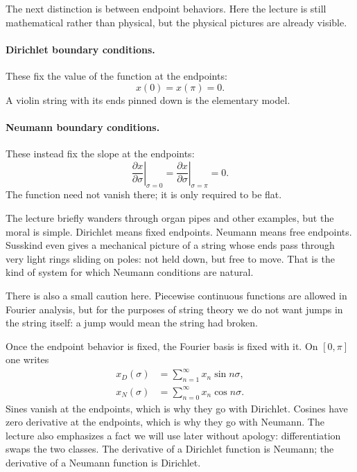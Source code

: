 The next distinction is between endpoint behaviors. Here the lecture is still mathematical rather than physical, but the physical pictures are already visible.

\paragraph{Dirichlet boundary conditions.}
These fix the value of the function at the endpoints:
\begin{equation}
x(0)=x(\pi)=0.
\end{equation}
A violin string with its ends pinned down is the elementary model.

\paragraph{Neumann boundary conditions.}
These instead fix the slope at the endpoints:
\begin{equation}
\left.\frac{\partial x}{\partial \sigma}\right|_{\sigma=0}
=
\left.\frac{\partial x}{\partial \sigma}\right|_{\sigma=\pi}
=0.
\end{equation}
The function need not vanish there; it is only required to be flat.

The lecture briefly wanders through organ pipes and other examples, but the moral is simple. Dirichlet means fixed endpoints. Neumann means free endpoints. Susskind even gives a mechanical picture of a string whose ends pass through very light rings sliding on poles: not held down, but free to move. That is the kind of system for which Neumann conditions are natural.

There is also a small caution here. Piecewise continuous functions are allowed in Fourier analysis, but for the purposes of string theory we do not want jumps in the string itself: a jump would mean the string had broken.

Once the endpoint behavior is fixed, the Fourier basis is fixed with it. On \([0,\pi]\) one writes
\begin{align}
x_D(\sigma) &= \sum_{n=1}^{\infty} x_n \sin n\sigma, \\
x_N(\sigma) &= \sum_{n=0}^{\infty} x_n \cos n\sigma .
\end{align}
Sines vanish at the endpoints, which is why they go with Dirichlet. Cosines have zero derivative at the endpoints, which is why they go with Neumann. The lecture also emphasizes a fact we will use later without apology: differentiation swaps the two classes. The derivative of a Dirichlet function is Neumann; the derivative of a Neumann function is Dirichlet.

